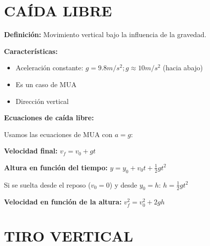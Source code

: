 \newpage

\section{CAÍDA LIBRE}

\begin{seccion}

\begin{definicion}
    \textbf{Definición:} Movimiento vertical bajo la influencia de la gravedad.
\end{definicion}

\vspace{0.3cm}

\textbf{Características:}
\begin{itemize}
    \item Aceleración constante: $g = 9.8 m/s^2 ; g \approx 10 m/s^2$ (hacia abajo)
    \item Es un caso de MUA
    \item Dirección vertical
\end{itemize}

\begin{ecuacion}
\textbf{Ecuaciones de caída libre:}

Usamos las ecuaciones de MUA con $a = g$:

\vspace{0.3cm}

\textbf{Velocidad final:}
$v_f = v_0 + gt$

\textbf{Altura en función del tiempo:}
$y = y_0 + v_0 t + \frac{1}{2}gt^2$

Si se suelta desde el reposo ($v_0 = 0$) y desde $y_0 = h$:
$h = \frac{1}{2}gt^2$

\textbf{Velocidad en función de la altura:}
$v_f^2 = v_0^2 + 2gh$
\end{ecuacion}
\end{seccion}


\section{TIRO VERTICAL}

